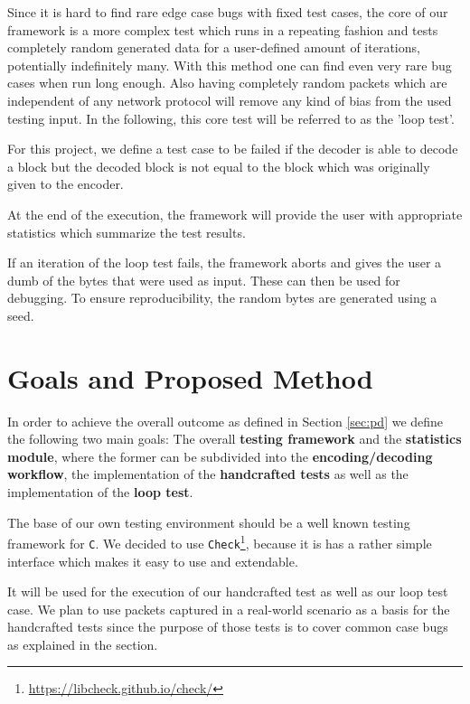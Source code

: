 \documentclass[a4paper,english,10pt]{tumarticle}
\begin{document}
Since it is hard to find rare edge case bugs with fixed test cases, the core of our framework is a
more complex test which runs in a repeating fashion and tests completely random generated data for a
user-defined amount of iterations, potentially indefinitely many. With this method one can find even
very rare bug cases when run long enough. Also having completely random packets which are
independent of any network protocol will remove any kind of bias from the used testing input. In the
following, this core test will be referred to as the 'loop test'.

For this project, we define a test case to be failed if the decoder is able to decode a block but
the decoded block is not equal to the block which was originally given to the encoder.

At the end of the execution, the framework will provide the user with appropriate statistics which
summarize the test results. 

If an iteration of the loop test fails, the framework aborts and gives the user a dumb of the bytes
that were used as input. These can then be used for debugging. To ensure reproducibility, the random
bytes are generated using a seed. 

\section{Goals and Proposed Method}\label{sec:milestones}


In order to achieve the overall outcome as defined in Section \ref{sec:pd} we define the following
two main goals: The overall \textbf{testing framework} and the \textbf{statistics module}, where the
former can be subdivided into the \textbf{encoding/decoding workflow}, the implementation of the
\textbf{handcrafted tests} as well as the implementation of the \textbf{loop test}.

The base of our own testing environment should be a well known testing framework for \texttt{C}. We
decided to use \texttt{Check}\footnote{\url{https://libcheck.github.io/check/}}, because it is has a
rather simple interface which makes it easy to use and extendable.

It will be used for the execution of our handcrafted test as well as our loop test case. We plan to
use packets captured in a real-world scenario as a basis for the handcrafted tests since the purpose
of those tests is to cover common case bugs as explained in the section.
\end{document}

